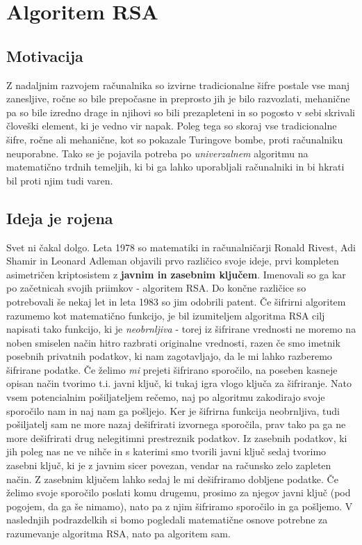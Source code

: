 \documentclass[a4paper, 12pt]{article} %
\begin{document}
\newpage
\section{Algoritem RSA}

\subsection{Motivacija}

Z nadaljnim razvojem računalnika so izvirne tradicionalne šifre postale vse manj zanesljive, ročne so bile prepočasne in preprosto jih je bilo razvozlati, mehanične pa so bile izredno drage in njihovi so bili prezapleteni in so pogosto v sebi skrivali človeški element, ki je vedno vir napak. Poleg tega so skoraj vse tradicionalne šifre, ročne ali mehanične, kot so pokazale Turingove bombe, proti računalniku neuporabne. Tako se je pojavila potreba po \emph{univerzalnem} algoritmu na matematično trdnih temeljih, ki bi ga lahko uporabljali računalniki in bi hkrati bil proti njim tudi varen.

\subsection{Ideja je rojena}

Svet ni čakal dolgo. Leta 1978 so matematiki in računalničarji Ronald Rivest, Adi Shamir in Leonard Adleman objavili prvo različico svoje ideje, prvi kompleten asimetričen kriptosistem z \textbf{javnim in zasebnim ključem}. Imenovali so ga kar po začetnicah svojih priimkov - algoritem RSA. Do končne različice so potrebovali še nekaj let in leta 1983 so jim odobrili patent.
\newline
\newline
Če šifrirni algoritem razumemo kot matematično funkcijo, je bil izumiteljem algoritma RSA cilj napisati tako funkcijo, ki je \emph{neobrnljiva} - torej iz šifrirane vrednosti ne moremo na noben smiselen način hitro razbrati originalne vrednosti, razen če smo imetnik posebnih privatnih podatkov, ki nam zagotavljajo, da le mi lahko razberemo šifrirane podatke. Če želimo \emph{mi} prejeti šifrirano sporočilo, na poseben kasneje opisan način tvorimo t.i. javni ključ, ki tukaj igra vlogo ključa za šifriranje. Nato vsem potencialnim pošiljateljem rečemo, naj po algoritmu zakodirajo svoje sporočilo nam in naj nam ga pošljejo. Ker je šifrirna funkcija neobrnljiva, tudi pošiljatelj sam ne more nazaj dešifrirati izvornega sporočila, prav tako pa ga ne more dešifrirati drug nelegitimni prestreznik podatkov. Iz zasebnih podatkov, ki jih poleg nas ne ve nihče in s katerimi smo tvorili javni ključ sedaj tvorimo zasebni ključ, ki je z javnim sicer povezan, vendar na računsko zelo zapleten način. Z zasebnim ključem lahko sedaj le mi dešifriramo dobljene podatke. Če želimo svoje sporočilo poslati komu drugemu, prosimo za njegov javni ključ (pod pogojem, da ga še nimamo), nato pa z njim šifriramo sporočilo in ga pošljemo.
\newline
\newline
V naslednjih podrazdelkih si bomo pogledali matematične osnove potrebne za razumevanje algoritma RSA, nato pa algoritem sam.
\end{document}
